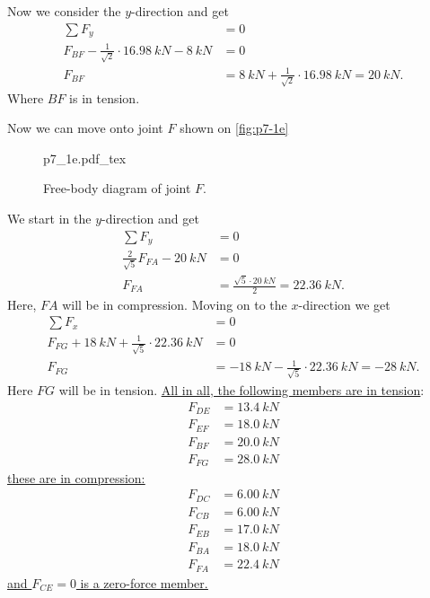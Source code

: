 \documentclass[a4paper]{article}
\newcommand{\incfig}[2][1]{%
  \def\svgwidth{#1\columnwidth}
  {#2.pdf_tex}
}
\theoremstyle{definition}
\begin{document}
Now we consider the $y$-direction and get
\begin{align*}
  \sum F_y &= 0 \\
  F_{BF} - \frac{1}{\sqrt{2}} \cdot \qty{16,98}{kN} - \qty{8}{kN} &= 0 \\
  F_{BF} &= \qty{8}{kN} + \frac{1}{\sqrt{2}} \cdot \qty{16,98}{kN} = \qty{20}{kN} 
.\end{align*}
Where $BF$ is in tension. 

Now we can move onto joint $F$ shown on \autoref{fig:p7-1e}

\begin{figure}[ht]
  \centering
  \incfig[0.35]{p7_1e}
  \caption{Free-body diagram of joint $F$.}
  \label{fig:p7-1e}
\end{figure}

We start in the $y$-direction and get
\begin{align*}
  \sum F_y &= 0 \\
  \frac{2}{\sqrt{5}} F_{FA} - \qty{20}{kN} &= 0 \\
  F_{FA} &=\frac{\sqrt{5} \cdot \qty{20}{kN} }{2} = \qty{22,36}{kN} 
.\end{align*}
Here, $FA$ will be in compression. Moving on to the $x$-direction we get
\begin{align*}
  \sum F_x &= 0 \\
  F_{FG} + \qty{18}{kN} + \frac{1}{\sqrt{5}} \cdot \qty{22,36}{kN} &= 0 \\
  F_{FG} &= \qty{-18}{kN} - \frac{1}{\sqrt{5}}\cdot \qty{22,36}{kN} = \qty{-28}{kN} 
.\end{align*}
Here $FG$ will be in tension. \underline{\underline{All in all, the following members are in tension}}:
\begin{align*}
  F_{DE} &= \qty{13,4}{kN}  \\
  F_{EF} &= \qty{18,0}{kN}  \\
  F_{BF} &= \qty{20,0}{kN}  \\
  F_{FG} &= \qty{28,0}{kN} 
\end{align*}
\underline{\underline{these are in compression:}}
\begin{align*}
  F_{DC} &= \qty{6,00}{kN}  \\
  F_{CB} &= \qty{6,00}{kN}  \\
  F_{EB} &= \qty{17,0}{kN}  \\
  F_{BA} &= \qty{18,0}{kN} \\
  F_{FA} &= \qty{22,4}{kN} 
\end{align*}
\underline{\underline{and $F_{CE} = 0$ is a zero-force member.}}
\end{document}
